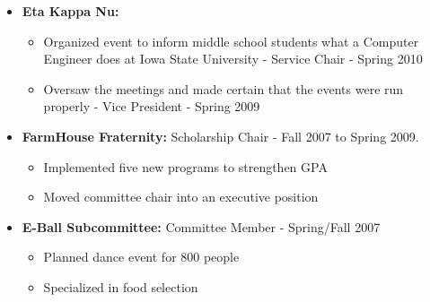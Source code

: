 \documentclass[oneside]{article}
\begin{document}
\begin{itemize}
\item{\bf Eta Kappa Nu:}
\begin{itemize}
  \item Organized event to inform middle school students what a Computer Engineer does at Iowa State University - Service Chair - Spring 2010
  \item Oversaw the meetings and made certain that the events were run properly - Vice President - Spring 2009
\end{itemize}

\item{\bf FarmHouse Fraternity:} Scholarship Chair - Fall 2007 to Spring 2009.
\begin{itemize}
  \item Implemented five new programs to strengthen GPA
  \item Moved committee chair into an executive position
\end{itemize}

\item{\bf E-Ball Subcommittee:} Committee Member - Spring/Fall 2007
\begin{itemize}
  \item Planned dance event for 800 people
  \item Specialized in food selection
\end{itemize}


\end{itemize}
\end{document}
